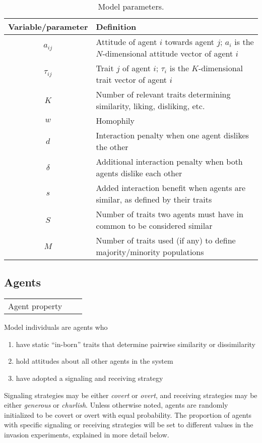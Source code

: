 \documentclass[11pt,letterpaper]{article}
\begin{document}
\vspace{1em}
\begin{table}[H]
  \centering
  \begin{tabular}{cl}
    Variable/parameter & Definition \\
    \toprule 
    $a_{ij}$   & Attitude of agent $i$ towards agent $j$; $a_i$ is the $N$-dimensional 
      attitude vector of agent $i$ \\
    $\tau_{ij}$ & Trait $j$ of agent $i$; $\tau_i$ is the $K$-dimensional trait vector of agent $i$ \\
    $K$      & Number of relevant traits determining similarity, liking, disliking, etc. \\
    $w$      & Homophily \\
    $d$      & Interaction penalty when one agent dislikes the other \\
    $\delta$ & Additional interaction penalty when both agents dislike each other \\
    $s$      & Added interaction benefit when agents are similar, as defined by their traits \\
    $S$      & Number of traits two agents must have in common to be considered similar \\
    $M$      & Number of traits used (if any) to define majority/minority populations \\
  \end{tabular}
  \caption{Model parameters.}
  \label{tab:params}
\end{table}

\subsection{Agents}

\begin{table}[H]
  \begin{tabular}{ccp{5in}}
    Agent property & 
  \end{tabular}
\end{table}

Model individuals are agents who 
\begin{enumerate}
  \item have static ``in-born'' traits that determine pairwise similarity or dissimilarity
  \item hold attitudes about all other agents in the system
  \item have adopted a signaling and receiving strategy
\end{enumerate}Signaling strategies
may be either \emph{covert} or \emph{overt}, and receiving strategies may be
either \emph{generous} or \emph{churlish}. Unless otherwise noted, agents are
randomly initialized to be covert or overt with equal probability. The 
proportion of agents with specific signaling or receiving strategies will be
set to different values in the invasion experiments, explained in more detail below.
\end{document}
